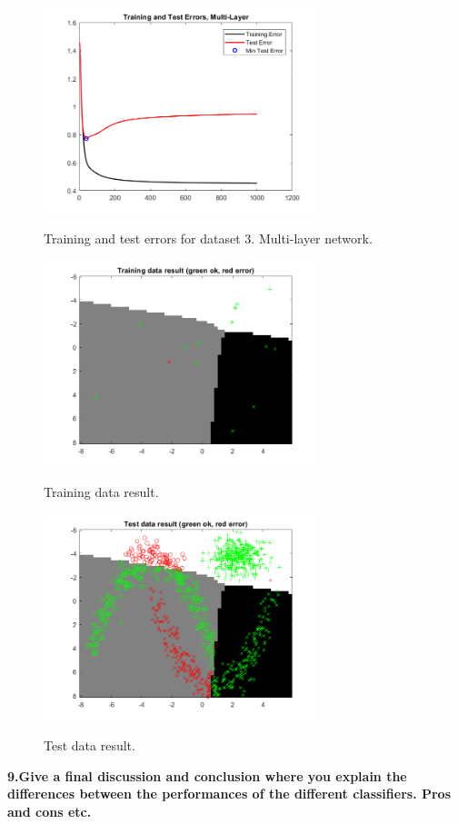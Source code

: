 \documentclass[twocolumn]{report}
\begin{document}
	\begin{figure}
		\includegraphics[width=8cm]{../error_set3.png}
		\label{img:testset1}
		\caption{Training and test errors for dataset 3. Multi-layer network.}
	\end{figure}
	
	\begin{figure}
		\includegraphics[width=8cm]{../training_set3.png}
		\label{img:testset1}
		\caption{Training data result.}
	\end{figure}
	
	\begin{figure}
		\includegraphics[width=8cm]{../test_set3.png}
		\label{img:testset1}
		\caption{Test data result.}
	\end{figure}
	
	\textbf{9.Give a final discussion and conclusion where you explain the differences between the performances of the different classifiers. Pros and cons etc. }
	
\end{document}
